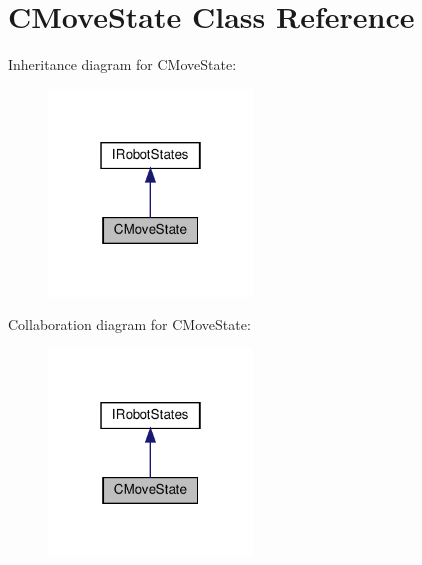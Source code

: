 \hypertarget{classCMoveState}{}\section{C\+Move\+State Class Reference}
\label{classCMoveState}


Inheritance diagram for C\+Move\+State\+:\nopagebreak
\begin{figure}[H]
\begin{center}
\leavevmode
\includegraphics[width=154pt]{classCMoveState__inherit__graph}
\end{center}
\end{figure}


Collaboration diagram for C\+Move\+State\+:\nopagebreak
\begin{figure}[H]
\begin{center}
\leavevmode
\includegraphics[width=154pt]{classCMoveState__coll__graph}
\end{center}
\end{figure}

